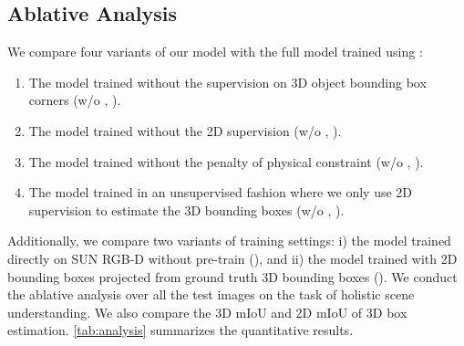 \documentclass{article}
\begin{document}
\begin{table}[b!]
    \caption{The ablative analysis of the proposed cooperative model on SUN RGB-D. We evaluate holistic scene understanding, 3D mIoU and 2D mIoU of box estimation under different settings.} 
    \setlength{\tabcolsep}{16pt}
    \centering
    \label{tab:analysis}
\end{table}

\subsection{Ablative Analysis}

We compare four variants of our model with the full model trained using :
\begin{enumerate}[leftmargin=*,noitemsep,nolistsep]
    \item The model trained without the supervision on 3D object bounding box corners (w/o , ).
    \item The model trained without the 2D supervision (w/o , ).
    \item The model trained without the penalty of physical constraint (w/o , ).
    \item The model trained in an unsupervised fashion where we only use 2D supervision to estimate the 3D bounding boxes (w/o , ).
\end{enumerate}

Additionally, we compare two variants of training settings: i) the model trained directly on SUN RGB-D without pre-train (), and ii) the model trained with 2D bounding boxes projected from ground truth 3D bounding boxes (). We conduct the ablative analysis over all the test images on the task of holistic scene understanding. We also compare the 3D mIoU and 2D mIoU of 3D box estimation. \autoref{tab:analysis} summarizes the quantitative results.
\end{document}

